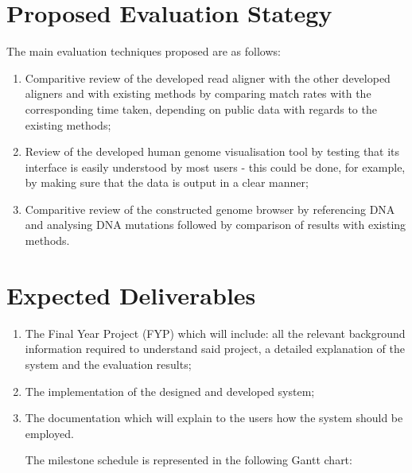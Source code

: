 \documentclass{csfyp}
\begin{document}
{{\section{Proposed Evaluation Stategy}\vspace{-2ex}

The main evaluation techniques proposed are as follows:

\begin{enumerate}[nolistsep]

  \item	Comparitive review of the developed read aligner with the other developed aligners and with existing methods by comparing match rates with the corresponding time taken, depending on public data with regards to the existing methods;

  \item Review of the developed human genome visualisation tool by testing that its interface is easily understood by most users - this could be done, for example, by making sure that the data is output in a clear manner;

  \item Comparitive review of the constructed genome browser by referencing DNA and analysing DNA mutations followed by comparison of results with existing methods.

\end{enumerate}


\section{Expected Deliverables}\vspace{-2ex}

\begin{enumerate}[nolistsep]

  \item The Final Year Project (FYP) which will include: all the relevant background information required to understand said project, a detailed explanation of the system and the evaluation results; 

  \item The implementation of the designed and developed system;

  \item The documentation which will explain to the users how the system should be employed. 

The milestone schedule is represented in the following Gantt chart: \\


\end{enumerate}}}
\end{document}
